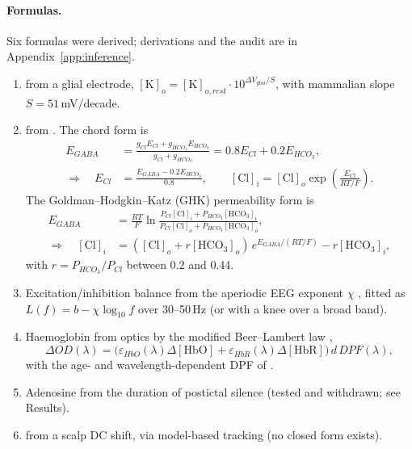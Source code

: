 \paragraph{Formulas.} Six formulas were derived; derivations and the audit are in Appendix~\ref{app:inference}.
\begin{enumerate}
\item \Ko{} from a glial electrode, $[\mathrm K]_{o} = [\mathrm K]_{o,rest}\cdot10^{\Delta V_{glia}/S}$, with mammalian slope $S=51$\,mV/decade.
\item \Cli{} from \EGABA. The chord form is
\begin{align}
E_{GABA} &= \frac{g_{Cl}E_{Cl}+g_{HCO_3}E_{HCO_3}}{g_{Cl}+g_{HCO_3}} = 0.8E_{Cl}+0.2E_{HCO_3},\\
\Rightarrow\quad E_{Cl} &= \frac{E_{GABA}-0.2E_{HCO_3}}{0.8},\qquad [\mathrm{Cl}]_i = [\mathrm{Cl}]_o\exp\!\left(\frac{E_{Cl}}{RT/F}\right).
\end{align}
The Goldman--Hodgkin--Katz (GHK) permeability form is
\begin{align}
E_{GABA} &= \frac{RT}{F}\ln\frac{P_{Cl}[\mathrm{Cl}]_i+P_{HCO_3}[\mathrm{HCO_3}]_i}{P_{Cl}[\mathrm{Cl}]_o+P_{HCO_3}[\mathrm{HCO_3}]_o},\\
\Rightarrow\quad [\mathrm{Cl}]_i &= ([\mathrm{Cl}]_o + r[\mathrm{HCO_3}]_o)\,e^{E_{GABA}/(RT/F)} - r[\mathrm{HCO_3}]_i,
\end{align}
with $r=P_{HCO_3}/P_{Cl}$ between 0.2 and 0.44.
\item Excitation/inhibition balance from the aperiodic EEG exponent $\chi$ \cite{donoghue2020,gao2017}, fitted as $L(f) = b-\chi\log_{10}f$ over 30--50\,Hz (or with a knee over a broad band).
\item Haemoglobin from optics by the modified Beer--Lambert law \cite{delpy1988},
\begin{equation}
\Delta OD(\lambda) = \big(\varepsilon_{HbO}(\lambda)\Delta[\mathrm{HbO}] + \varepsilon_{HbR}(\lambda)\Delta[\mathrm{HbR}]\big)\,d\,DPF(\lambda),
\end{equation}
with the age- and wavelength-dependent DPF of \cite{scholkmann2013}.
\item Adenosine from the duration of postictal silence (tested and withdrawn; see Results).
\item \Kp{} from a scalp DC shift, via model-based tracking (no closed form exists).
\end{enumerate}

